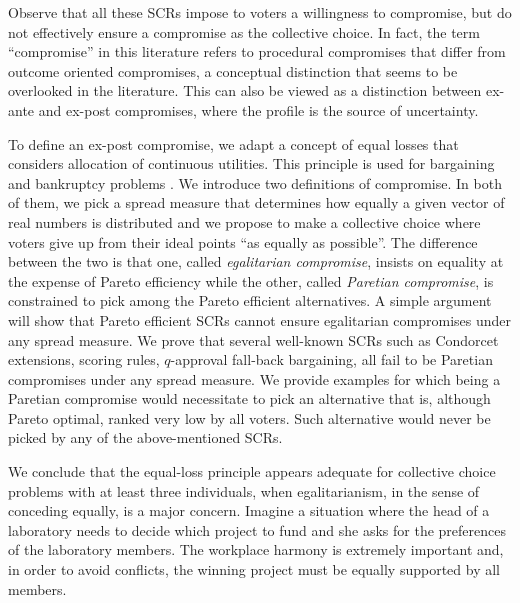 Observe that all these \acp{SCR} impose to voters a willingness to compromise, but do not effectively ensure a compromise as the collective choice. In fact, the term “compromise” in this literature refers to procedural compromises that differ from outcome oriented compromises, a conceptual distinction that seems to be overlooked in the literature.
This can also be viewed as a distinction between ex-ante and ex-post compromises, where the profile is the source of uncertainty.

To define an ex-post compromise, we adapt a concept of equal losses that considers allocation of continuous utilities. This principle is used for bargaining \citep{Chun1988, Chun1991} and bankruptcy problems \citep{Herrero2001}. 
We introduce two definitions of compromise. In both of them, we pick a spread measure that determines how equally a given vector of real numbers   is distributed and we propose to make a collective choice where voters give up from their ideal points “as equally as possible”. The difference between the two is that one, called \emph{egalitarian compromise}, insists on equality at the expense of Pareto efficiency while the other, called \emph{Paretian compromise}, is constrained to pick among the Pareto efficient alternatives. A simple argument will show that Pareto efficient \acp{SCR} cannot ensure egalitarian compromises under any spread measure. We prove that several well-known \acp{SCR} such as Condorcet extensions, scoring rules, $q$-approval fall-back bargaining, all fail to be Paretian compromises under any spread measure. We provide examples for which being a Paretian compromise would necessitate to pick an alternative that is, although Pareto optimal, ranked very low by all voters. Such alternative would never be picked by any of the above-mentioned \acp{SCR}. 

We conclude that the equal-loss principle appears adequate for collective choice problems with at least three individuals, when egalitarianism, in the sense of conceding equally, is a major concern. Imagine a situation where the head of a laboratory needs to decide which project to fund and she asks for the preferences of the laboratory members. The workplace harmony is extremely important and, in order to avoid conflicts, the winning project must be equally supported by all members. 

